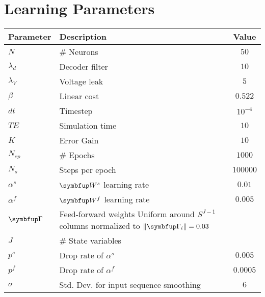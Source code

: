 \chapter{Learning Parameters}
\begin{center}
	\begin{tabular}{|>{\bfseries}l|p{8cm}|c|}
		\hline
		Parameter & Description & Value \\
		\hline
		$N$ & \# Neurons & $50$ \\
		\hline
		$\lambda_d$ & Decoder filter & $10$ \\
		\hline
		$\lambda_V$ & Voltage leak & $5$ \\
		\hline
		$\beta$ & Linear cost & $0.522$ \\
		\hline
		$dt$ & Timestep & $10^{-4}$ \\
		\hline
		$TE$ & Simulation time & $10$ \\
		\hline
		$K$ & Error Gain & $10$ \\
		\hline
		$N_{ep}$ & \# Epochs & $1000$ \\
		\hline
		$N_s $ & Steps per epoch & $100000$ \\
		\hline
		$\alpha^s$ & $\bmu{W}^s$ learning rate & $0.01$\\
		\hline
		$\alpha^f$ & $\bmu{W}^f$ learning rate & $0.005$\\
		\hline
		$\bmu{\Gamma}$ & Feed-forward weights Uniform around $S^{J-1}$ columns normalized to $\|\bmu{\Gamma}_i\| = 0.03$ & \\
		\hline
		$J$ & \# State variables & \\
		\hline
		$p^s$ & Drop rate of $\alpha^s$ & $0.005$\\
		\hline
		$p^f$ & Drop rate of $\alpha^f$ & $0.0005$\\
		\hline
		$\sigma$ & Std. Dev. for input sequence smoothing & $6$\\
		\hline
	\end{tabular}
\end{center}